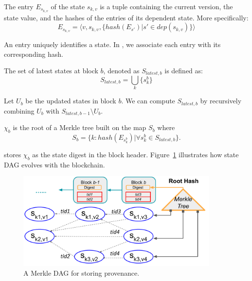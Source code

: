 \begin{definition} \label{def:entry}
The entry $E_{s_{k,v}}$ of the state $s_{k,v}$ is a tuple containing the current version, the state value, and the
hashes of the entries of its dependent state. More specifically:
  \begin{displaymath}
    E_{s_{k,v}}= \langle v, s_{k,v}, \{hash(E_{s'})|s' \in dep(s_{k,v})\} \rangle
  \end{displaymath}
\end{definition}
\noindent An entry uniquely identifies a state. In {\fs}, we associate each entry with its corresponding
hash. 

\begin{definition}
The set of latest states at block $b$, denoted as $S_{latest,b}$ is defined as: 
  \begin{displaymath}
    S_{latest, b} = \bigcup\limits_{k}\{s^b_k\}
  \end{displaymath}
\end{definition}
\noindent Let $U_b$ be the updated states in block $b$. We can compute $S_{latest, b}$ by recursively
combining $U_b$ with $S_{latest, b-1} \setminus U_b$.  

\begin{definition}
$\chi_b$ is the root of a Merkle tree built on the map $S_b$ where 
  \begin{displaymath}
  S_b = \{k:hash(E_{s^b_{k}}) | \forall s^b_{k} \in S_{latest, b}\}. 
  \end{displaymath}
\end{definition}

{\fs} stores $\chi_b$ as the state digest in the block header. Figure~\ref{diagram:prov:dag} illustrates how state DAG evolves with the blockchain.

\begin{figure}
  \centering
  \includegraphics[width=0.9\textwidth]{diagram/provenance/DAG.pdf}
\caption{A Merkle DAG for storing provenance. }
\label{diagram:prov:dag} 
\end{figure}

